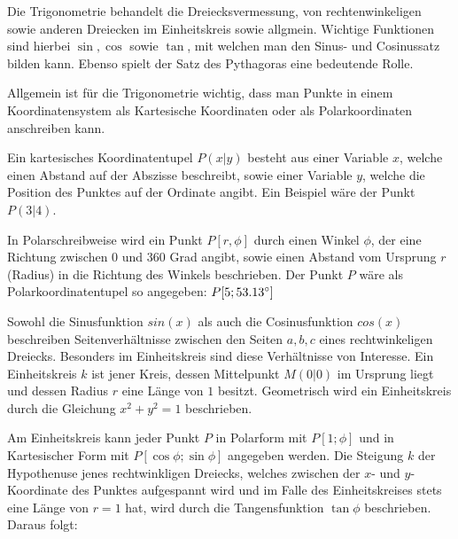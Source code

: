 



\thispagestyle{plain}



Die Trigonometrie behandelt die Dreiecksvermessung, von rechtenwinkeligen sowie anderen Dreiecken im Einheitskreis sowie allgmein. Wichtige Funktionen sind hierbei $\sin, \cos$ sowie $\tan$, mit welchen man den Sinus- und Cosinussatz bilden kann. Ebenso spielt der Satz des Pythagoras eine bedeutende Rolle.


Allgemein ist f\"{u}r die Trigonometrie wichtig, dass man Punkte in einem Koordinatensystem als Kartesische Koordinaten oder als Polarkoordinaten anschreiben kann. 

Ein kartesisches Koordinatentupel $P (x | y)$ besteht aus einer Variable $x$, welche einen Abstand auf der Abszisse beschreibt, sowie einer Variable $y$, welche die Position des Punktes auf der Ordinate angibt. Ein Beispiel w\"{a}re der Punkt $P(3 | 4)$.

In Polarschreibweise wird ein Punkt $P [r, \phi]$ durch einen Winkel $\phi$, der eine Richtung zwischen $0$ und $360$ Grad angibt, sowie einen Abstand vom Ursprung $r$ (Radius) in die Richtung des Winkels beschrieben. Der Punkt $P$ w\"{a}re als Polarkoordinatentupel so angegeben: $P [5; 53.13\degree]$


Sowohl die Sinusfunktion $sin(x)$ als auch die Cosinusfunktion $cos(x)$ beschreiben Seitenverh\"{a}ltnisse zwischen den Seiten $a, b, c$ eines rechtwinkeligen Dreiecks. Besonders im Einheitskreis sind diese Verh\"{a}ltnisse von Interesse. Ein Einheitskreis $k$ ist jener Kreis, dessen Mittelpunkt $M (0 | 0)$ im Ursprung liegt und dessen Radius $r$ eine L\"{a}nge von $1$ besitzt. Geometrisch wird ein Einheitskreis durch die Gleichung $x^2 + y^2 = 1$ beschrieben.

Am Einheitskreis kann jeder Punkt $P$ in Polarform mit $P [1;\phi]$ und in Kartesischer Form mit $P [\cos \phi; \sin \phi]$ angegeben werden. Die Steigung $k$ der Hypothenuse jenes rechtwinkligen Dreiecks, welches zwischen der $x$- und $y$-Koordinate des Punktes aufgespannt wird und im Falle des Einheitskreises stets eine L\"{a}nge von $r = 1$ hat, wird durch die Tangensfunktion $\tan \phi$ beschrieben. Daraus folgt:

